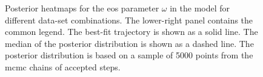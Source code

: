 \begin{figure}[htbp]
    \tagstructend
    \caption[Posterior heatmaps for equation of state.]{Posterior heatmaps for the \gls{eos} parameter $\omega$ in the  model for different data-set combinations. The lower-right panel contains the common legend. The best-fit trajectory is shown as a solid line. The median of the posterior distribution is shown as a dashed line. The posterior distribution is based on a sample of 5000 points from the \gls{mcmc} chains of accepted steps.}
    \label{fig:HyperbolicEoSHeatmap}
\end{figure}